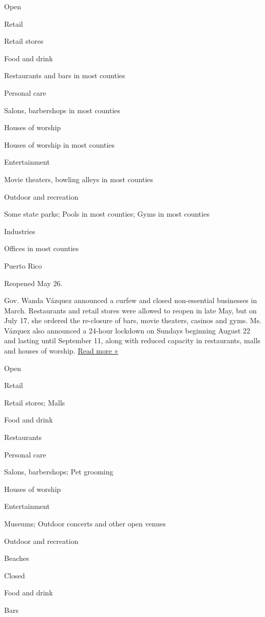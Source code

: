 Open

Retail

Retail stores

Food and drink

Restaurants and bars in most counties

Personal care

Salons, barbershops in most counties

Houses of worship

Houses of worship in most counties

Entertainment

Movie theaters, bowling alleys in most counties

Outdoor and recreation

Some state parks; Pools in most counties; Gyms in most counties

Industries

Offices in most counties

Puerto Rico

Reopened May 26.

Gov. Wanda Vázquez announced a curfew and closed non-essential
businesses in March. Restaurants and retail stores were allowed to
reopen in late May, but on July 17, she ordered the re-closure of bars,
movie theaters, casinos and gyms. Ms. Vázquez also announced a 24-hour
lockdown on Sundays beginning August 22 and lasting until September 11,
along with reduced capacity in restaurants, malls and houses of worship.
\href{https://www.washingtonpost.com/world/the_americas/puerto-rico-imposes-stricter-measures-amid-coronavirus-spike/2020/08/19/f597247e-e265-11ea-82d8-5e55d47e90ca_story.html}{Read
more »}

Open

Retail

Retail stores; Malls

Food and drink

Restaurants

Personal care

Salons, barbershops; Pet grooming

Houses of worship

Entertainment

Museums; Outdoor concerts and other open venues

Outdoor and recreation

Beaches

Closed

Food and drink

Bars

